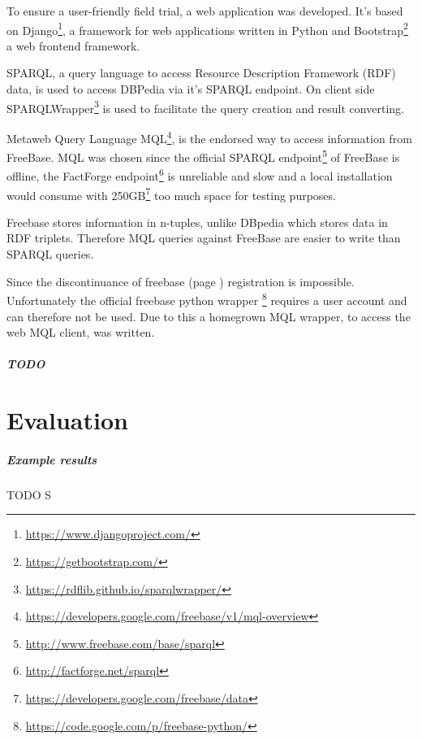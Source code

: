 \documentclass[11pt,titlepage,oneside,openany]{book}
\begin{document}
To ensure a user-friendly field trial, a web application was developed. It's based on 
Django\footnote{\url{https://www.djangoproject.com/}}, a framework for web applications written in Python and Bootstrap\footnote{\url{https://getbootstrap.com/}} a web frontend framework.

SPARQL, a query language to access Resource Description Framework (RDF) data, is used to access DBPedia via it's SPARQL endpoint. On client side SPARQLWrapper\footnote{\url{https://rdflib.github.io/sparqlwrapper/}} is used to facilitate the query creation and result converting. 


Metaweb Query Language MQL\footnote{\url{https://developers.google.com/freebase/v1/mql-overview}}, is the endorsed way to access information from FreeBase. MQL was chosen since the official SPARQL endpoint\footnote{\url{http://www.freebase.com/base/sparql}} of FreeBase is offline, the FactForge endpoint\footnote{\url{http://factforge.net/sparql}} is unreliable and slow and a local installation would consume with 250GB\footnote{\url{https://developers.google.com/freebase/data}} too much space for testing purposes.

Freebase stores information in n-tuples, unlike DBpedia which stores data in RDF triplets. Therefore MQL queries against FreeBase are easier to write than SPARQL queries.


Since the discontinuance of freebase (page \pageref{prob:freebase}) registration is impossible. Unfortunately the official freebase python wrapper \footnote{\url{https://code.google.com/p/freebase-python/}} requires a user account and can therefore not be used. Due to this a homegrown MQL wrapper, to access the web MQL client, was written.



  \paragraph{TODO}
\label{sec:TODO}


\chapter{Evaluation}
\label{cha:evaluation}

\paragraph{Example results}
\label{cha:example}

TODO S
\end{document}

